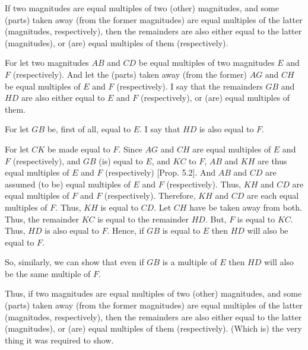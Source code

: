 \begin{Parallel}{}{}
{If two magnitudes are equal multiples of two (other) magnitudes, and some (parts) taken away (from the former magnitudes) are equal multiples of the latter (magnitudes, respectively),
then the remainders  are also either equal to the latter (magnitudes), or (are) equal multiples of them (respectively).

For let two magnitudes $AB$ and $CD$ be equal multiples of two magnitudes
$E$ and $F$ (respectively). And let the (parts)  taken away (from the former) $AG$ and $CH$ be equal multiples of $E$ and $F$ (respectively). I say that the remainders $GB$ and
$HD$ are also either equal to $E$ and $F$ (respectively), or (are) equal multiples of them.

\epsfysize=1.8in
\centerline{}

For let $GB$ be, first of all, equal to $E$. I say that $HD$ is also equal to $F$.

For let  $CK$ be made equal to $F$. Since $AG$ and $CH$ are equal multiples of $E$ and $F$ (respectively), and $GB$ (is) equal to $E$, and $KC$ to $F$,
$AB$ and $KH$ are thus equal multiples of $E$ and $F$ (respectively)
[Prop. 5.2].
And $AB$ and $CD$ are assumed (to be) equal multiples of $E$ and $F$ (respectively). Thus, $KH$ and $CD$ are equal multiples of $F$ and $F$ (respectively). Therefore, $KH$ and $CD$ are each equal multiples of $F$. Thus, $KH$
is equal to $CD$. Let $CH$ have be taken away from both. Thus, the remainder
$KC$ is equal to the remainder $HD$. But, $F$ is equal to $KC$. Thus, $HD$ is also equal to $F$. Hence, if $GB$ is equal to $E$ then $HD$ will also be equal to $F$.

So, similarly, we can show that even if $GB$ is a multiple of $E$ then $HD$
will also be the same multiple of $F$.

Thus, if two magnitudes are equal multiples of two (other) magnitudes, and some (parts) taken away (from the former magnitudes) are equal multiples of the latter (magnitudes, respectively),
then the remainders  are also either equal to the latter (magnitudes), or (are) equal multiples of them (respectively). (Which is) the very thing it was required to show.}
\end{Parallel}


\vspace{7pt}{\footnotesize \noindent$^\dag$ In modern notation, this
proposition reads $m\,\alpha-n\,\alpha = (m-n)\,\alpha$.}

